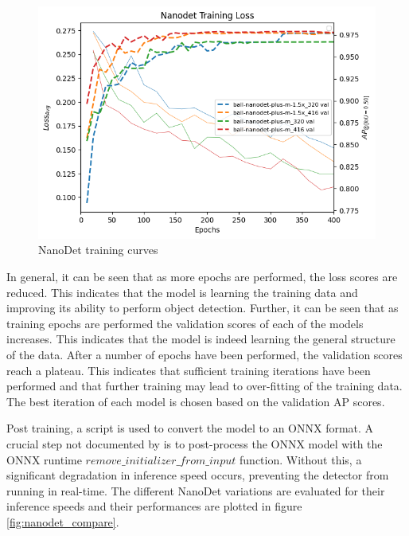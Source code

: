 \documentclass[a4paper,twoside,12pt]{report}
\begin{document}
\begin{figure}[h!]
\begin{center}
\includegraphics[width=13cm]{images/nanodet_train.png}
\caption{NanoDet training curves}
\label{fig:nanodet_train}
\end{center}
\end{figure}

In general, it can be seen that as more epochs are performed, the loss scores are reduced. This indicates that the model is learning the training data and improving its ability to perform object detection. Further, it can be seen that as training epochs are performed the validation scores of each of the models increases. This indicates that the model is indeed learning the general structure of the data. After a number of epochs have been performed, the validation scores reach a plateau. This indicates that sufficient training iterations have been performed and that further training may lead to over-fitting of the training data. The best iteration of each model is chosen based on the validation AP scores. 

Post training, a script is used to convert the model to an ONNX format. A crucial step not documented by \cite{nanodet} is to post-process the ONNX model with the ONNX runtime $remove\_initializer\_from\_input$ function. Without this, a significant degradation in inference speed occurs, preventing the detector from running in real-time. The different NanoDet variations are evaluated for their inference speeds and their performances are plotted in figure \ref{fig:nanodet_compare}.
\end{document}
